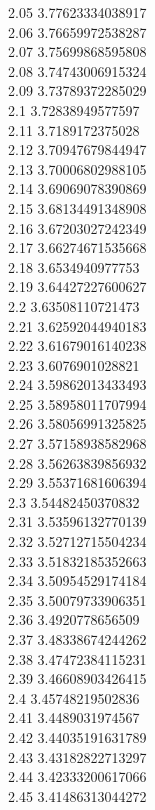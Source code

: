 {2.05	3.77623334038917\\
2.06	3.76659972538287\\
2.07	3.75699868595808\\
2.08	3.74743006915324\\
2.09	3.73789372285029\\
2.1	3.72838949577597\\
2.11	3.7189172375028\\
2.12	3.70947679844947\\
2.13	3.70006802988105\\
2.14	3.69069078390869\\
2.15	3.68134491348908\\
2.16	3.67203027242349\\
2.17	3.66274671535668\\
2.18	3.6534940977753\\
2.19	3.64427227600627\\
2.2	3.63508110721473\\
2.21	3.62592044940183\\
2.22	3.61679016140238\\
2.23	3.6076901028821\\
2.24	3.59862013433493\\
2.25	3.58958011707994\\
2.26	3.58056991325825\\
2.27	3.57158938582968\\
2.28	3.56263839856932\\
2.29	3.55371681606394\\
2.3	3.54482450370832\\
2.31	3.53596132770139\\
2.32	3.52712715504234\\
2.33	3.51832185352663\\
2.34	3.50954529174184\\
2.35	3.50079733906351\\
2.36	3.4920778656509\\
2.37	3.48338674244262\\
2.38	3.47472384115231\\
2.39	3.46608903426415\\
2.4	3.45748219502836\\
2.41	3.4489031974567\\
2.42	3.44035191631789\\
2.43	3.43182822713297\\
2.44	3.42333200617066\\
2.45	3.41486313044272\\
}
